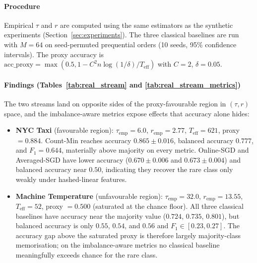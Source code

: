 \documentclass[preprint,12pt,authoryear]{elsarticle}
\newcommand{\Teff}{T_{\mathrm{eff}}}
\begin{document}
\paragraph{Procedure} Empirical $\tau$ and $r$ are computed using the same estimators as the synthetic experiments (Section~\ref{sec:experiments}). The three classical baselines are run with $M = 64$ on seed-permuted prequential orders (10 seeds, 95\% confidence intervals). The proxy accuracy is $\mathrm{acc\_proxy} = \max(0.5, 1 - C^2 n \log(1/\delta) / \Teff)$ with $C = 2$, $\delta = 0.05$.

\paragraph{Findings (Tables~\ref{tab:real_stream} and \ref{tab:real_stream_metrics})} The two streams land on opposite sides of the proxy-favourable region in $(\tau, r)$ space, and the imbalance-aware metrics expose effects that accuracy alone hides:
\begin{itemize}
    \item \textbf{NYC Taxi} (favourable region): $\tau_{\text{emp}} = 6.0$, $r_{\text{emp}} = 2.77$, $\Teff = 621$, proxy $= 0.884$. Count-Min reaches accuracy $0.865 \pm 0.016$, balanced accuracy $0.777$, and $F_1 = 0.644$, materially above majority on every metric. Online-SGD and Averaged-SGD have lower accuracy ($0.670 \pm 0.006$ and $0.673 \pm 0.004$) and balanced accuracy near $0.50$, indicating they recover the rare class only weakly under hashed-linear features.
    \item \textbf{Machine Temperature} (unfavourable region): $\tau_{\text{emp}} = 32.0$, $r_{\text{emp}} = 13.55$, $\Teff = 52$, proxy $= 0.500$ (saturated at the chance floor). All three classical baselines have accuracy near the majority value ($0.724$, $0.735$, $0.801$), but balanced accuracy is only $0.55$, $0.54$, and $0.56$ and $F_1 \in [0.23, 0.27]$. The accuracy gap above the saturated proxy is therefore largely majority-class memorisation; on the imbalance-aware metrics no classical baseline meaningfully exceeds chance for the rare class.
\end{itemize}
\end{document}
